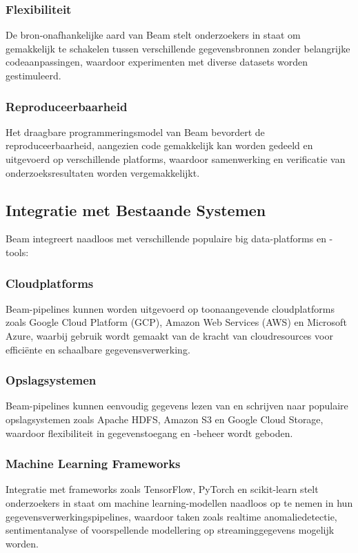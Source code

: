 \subsubsection{Flexibiliteit}
De bron-onafhankelijke aard van Beam stelt onderzoekers in staat om gemakkelijk te schakelen tussen verschillende gegevensbronnen zonder belangrijke codeaanpassingen, waardoor experimenten met diverse datasets worden gestimuleerd.

\subsubsection{Reproduceerbaarheid}
Het draagbare programmeringsmodel van Beam bevordert de reproduceerbaarheid, aangezien code gemakkelijk kan worden gedeeld en uitgevoerd op verschillende platforms, waardoor samenwerking en verificatie van onderzoeksresultaten worden vergemakkelijkt.

\subsection{Integratie met Bestaande Systemen}

Beam integreert naadloos met verschillende populaire big data-platforms en -tools:

\subsubsection{Cloudplatforms}
Beam-pipelines kunnen worden uitgevoerd op toonaangevende cloudplatforms zoals Google Cloud Platform (GCP), Amazon Web Services (AWS) en Microsoft Azure, waarbij gebruik wordt gemaakt van de kracht van cloudresources voor efficiënte en schaalbare gegevensverwerking.

\subsubsection{Opslagsystemen}
Beam-pipelines kunnen eenvoudig gegevens lezen van en schrijven naar populaire opslagsystemen zoals Apache HDFS, Amazon S3 en Google Cloud Storage, waardoor flexibiliteit in gegevenstoegang en -beheer wordt geboden.

\subsubsection{Machine Learning Frameworks}
Integratie met frameworks zoals TensorFlow, PyTorch en scikit-learn stelt onderzoekers in staat om machine learning-modellen naadloos op te nemen in hun gegevensverwerkingspipelines, waardoor taken zoals realtime anomaliedetectie, sentimentanalyse of voorspellende modellering op streaminggegevens mogelijk worden.

